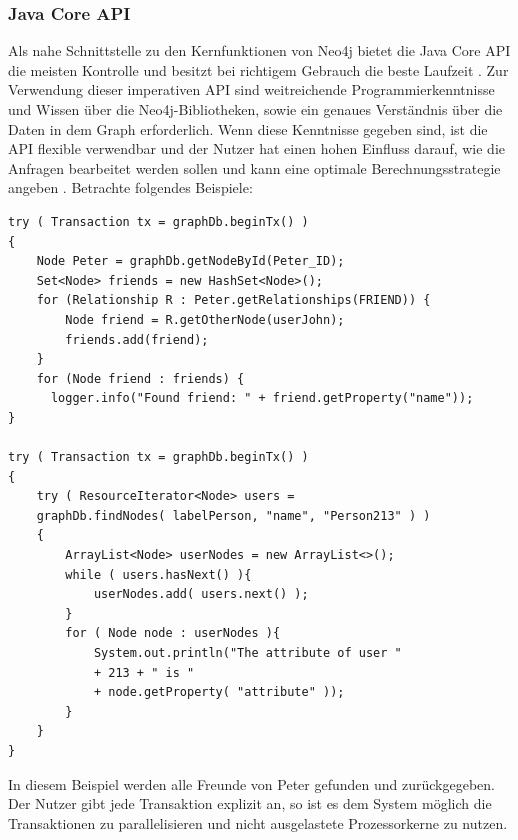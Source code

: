 \subsubsection{Java Core API}
Als nahe Schnittstelle zu den Kernfunktionen von Neo4j bietet die Java Core API die meisten Kontrolle und besitzt bei richtigem Gebrauch die beste Laufzeit \parencite{vukotic2015neo4j}. Zur Verwendung dieser imperativen API sind weitreichende Programmierkenntnisse und Wissen über die Neo4j-Bibliotheken, sowie ein genaues Verständnis  über die Daten in dem Graph erforderlich. Wenn diese Kenntnisse gegeben sind, ist die API flexible verwendbar  und der Nutzer hat einen hohen Einfluss darauf, wie die Anfragen bearbeitet werden sollen und kann eine optimale Berechnungsstrategie angeben \parencite{vukotic2015neo4j}. Betrachte folgendes Beispiele: \newline
\begin{Verbatim}[frame=single]
try ( Transaction tx = graphDb.beginTx() )
{
	Node Peter = graphDb.getNodeById(Peter_ID);
	Set<Node> friends = new HashSet<Node>();
	for (Relationship R : Peter.getRelationships(FRIEND)) {  
		Node friend = R.getOtherNode(userJohn);
		friends.add(friend);                        
	}
	for (Node friend : friends) {
	  logger.info("Found friend: " + friend.getProperty("name")); 
}

try ( Transaction tx = graphDb.beginTx() )
{
	try ( ResourceIterator<Node> users =
	graphDb.findNodes( labelPerson, "name", "Person213" ) )
	{
		ArrayList<Node> userNodes = new ArrayList<>();
		while ( users.hasNext() ){
			userNodes.add( users.next() );
		}
		for ( Node node : userNodes ){
			System.out.println("The attribute of user " 
			+ 213 + " is " 
			+ node.getProperty( "attribute" ));
		}
	}
}
\end{Verbatim}

In diesem Beispiel werden alle Freunde von Peter gefunden und zurückgegeben. Der Nutzer gibt jede Transaktion explizit an, so ist es dem System möglich die Transaktionen zu parallelisieren und nicht ausgelastete Prozessorkerne zu nutzen.

